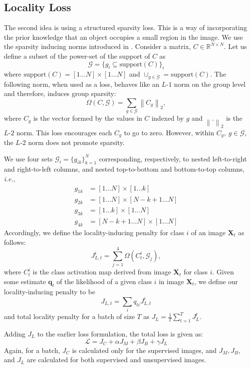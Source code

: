 \subsection{Locality Loss}
The second idea is using a structured sparsity loss. This is a way of incorporating the prior knowledge
that an object occupies a small region in the image. We use the sparsity inducing norms introduced in
\cite{groupsparsity,sparsepca}. Consider a matrix, $C \in \mathbb{R}^{N \times
N}$. Let us define a subset of the power-set of the support of $C$ as
\begin{equation}
	\mathcal{G} = \{g_i \subseteq \textrm{support}(C)\}_i
\end{equation}
where $\textrm{support}(C) = [1 \dots N] \times [1 \dots N]$ and $\cup_{g \in \mathcal{G}} = \textrm{support}(C)$. The following norm, when used as a
loss, behaves like an $L$-$1$ norm on the group level and therefore, induces group sparsity:
\begin{equation}
	\Omega (C, \mathcal{G}) = \sum_{g \in \mathcal{G}} \left\lVert C_g \right\rVert _2,
\end{equation}
where $C_g$ is the vector formed by the values in $C$ indexed by $g$ and $\left\lVert . \right\rVert_2$ is
the $L$-$2$ norm. This loss encourages each $C_g$ to go to zero. However, within $C_g,~g
\in \mathcal{G}$, the $L$-$2$ norm does not promote sparsity.

We use four sets $\mathcal G_i = \{g_{ik}\}_{k=1}^N$ corresponding, respectively, to nested
left-to-right and right-to-left columns, and nested top-to-bottom and bottom-to-top columns,
\textit{i.e.,}
\begin{align}
  g_{1k} & = [1 \ldots N] \times [1 \ldots k] \\
  g_{2k} & = [1 \ldots N] \times [N-k+1 \ldots N] \\
  g_{3k} & = [1 \ldots k] \times [1 \ldots N] \\
  g_{4k} & = [N-k+1 \ldots N] \times [1 \ldots N]
\end{align}
Accordingly, we define the locality-inducing penalty for class $i$ of an image $\mathbf{X}_t$ as follows:
\begin{equation} \label{eq:JLt}
	J_{L,t}^{i} = \sum_{j=1}^{4}\Omega(C^i_t, \mathcal G_j),
\end{equation}
where $C^i_{t}$ is the class activation map \cite{CAM} derived from image $\mathbf X_t$ for class
$i$. Given some estimate $\mathbf q_{t}$ of the likelihood of a given class $i$ in image $\mathbf
X_t$, we define our locality-inducing penalty to be
\begin{equation}
  J_{L,t} = \sum_{i} q_{ti} J_{L,t}^i
\end{equation}
and total locality penalty for a batch of size $T$ as $J_L =  \frac{1}{T} \sum_{t=1}^T J_L^t$. 

Adding $J_L$ to the earlier loss formulation, the total loss is given as:
\begin{equation}
	\label{eq:total}
	\mathcal{L} = J_C + \alpha J_M + \beta J_B + \gamma J_L
\end{equation}
Again, for a batch, $J_C$ is calculated only for the supervised images, and $J_M, J_B, $ and $J_L$
are calculated for both supervised and unsupervised images.
